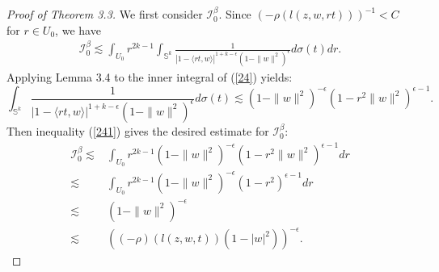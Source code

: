 \documentclass[reqno,12pt]{amsart}
\numberwithin{equation}{section}
\begin{document}
\begin{proof}[Proof of Theorem 3.3]
			We first consider $\mathcal I^\beta_0$. Since $(-\rho(l(z,w,rt)))^{-1}<C$ for $r\in U_0$, {we have}
			\begin{align}\label{24}
			\mathcal I^{\beta}_0\lesssim\int_{U_0}r^{2k-1}\int_{\mathbb S^k}\frac{1}{|1-\langle rt,w\rangle|^{1+k-\epsilon}(1-\|w\|^2)^{\epsilon}}d\sigma (t)dr.
			\end{align}
			Applying Lemma 3.4 to the inner integral  of (\ref{24}) yields:
			\begin{equation}\label{241}
			\int_{\mathbb S^k}\frac{1}{|1-\langle rt,w\rangle|^{1+k-\epsilon}(1-\|w\|^2)^{\epsilon}}d\sigma (t)\lesssim(1-\|w\|^2)^{-\epsilon}(1-r^2\|w\|^2)^{\epsilon-1}.
			\end{equation}
			{Then {inequality} (\ref{241}) }gives the desired estimate for $\mathcal I^{\beta}_0$:
			\begin{align}\label{25}
			\mathcal I^{\beta}_0\lesssim&\int_{U_0}r^{2k-1}(1-\|w\|^2)^{-\epsilon}(1-r^2\|w\|^2)^{\epsilon-1}dr\nonumber\\\lesssim&\int_{U_0}r^{2k-1}(1-\|w\|^2)^{-\epsilon}(1-r^2)^{\epsilon-1}dr\nonumber\\\lesssim &(1-\|w\|^2)^{-\epsilon}\nonumber\\\lesssim&\left((-\rho)(l(z,w,t))(1-|w|^2)\right)^{-\epsilon}.
			\end{align}
			

\end{proof}
\end{document}
